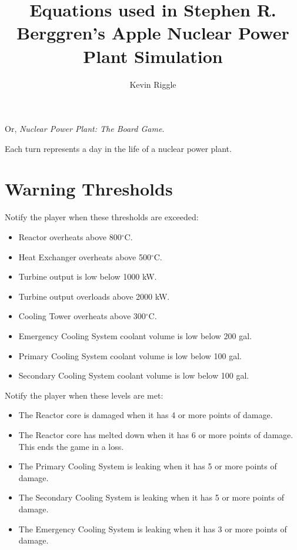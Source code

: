 \documentclass{article}
\begin{document}
\title{Equations used in Stephen R. Berggren's Apple Nuclear Power Plant Simulation}
\author{Kevin Riggle}

\maketitle


Or, \emph{Nuclear Power Plant: The Board Game}.

Each turn represents a day in the life of a nuclear power plant.

\section{Warning Thresholds}

Notify the player when these thresholds are exceeded:

\begin{itemize}
\item Reactor overheats above 800$^{\circ}$C.
\item Heat Exchanger overheats above 500$^{\circ}$C.
\item Turbine output is low below 1000 kW.
\item Turbine output overloads above 2000 kW.
\item Cooling Tower overheats above 300$^{\circ}$C.
\item Emergency Cooling System coolant volume is low below 200 gal.
\item Primary Cooling System coolant volume is low below 100 gal.
\item Secondary Cooling System coolant volume is low below 100 gal.
\end{itemize}

Notify the player when these levels are met:

\begin{itemize}
\item The Reactor core is damaged when it has 4 or more points of damage.
\item The Reactor core has melted down when it has 6 or more points of damage.  This ends the game in a loss.
\item The Primary Cooling System is leaking when it has 5 or more points of damage.
\item The Secondary Cooling System is leaking when it has 5 or more points of damage.
\item The Emergency Cooling System is leaking when it has 3 or more points of damage.
\end{itemize}
\end{document}
